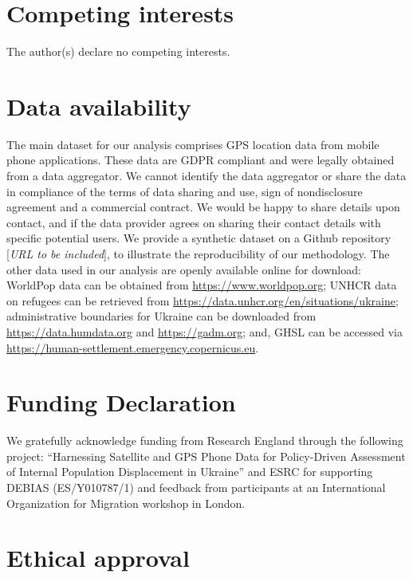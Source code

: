 \documentclass[
  sn-nature,
  11pt,
]{sn-jnl}
\begin{document}
\section{Competing interests}\label{competing-interests}

The author(s) declare no competing interests.

\section{Data availability}\label{data-availability}

The main dataset for our analysis comprises GPS location data from
mobile phone applications. These data are GDPR compliant and were
legally obtained from a data aggregator. We cannot identify the data
aggregator or share the data in compliance of the terms of data sharing
and use, sign of nondisclosure agreement and a commercial contract. We
would be happy to share details upon contact, and if the data provider
agrees on sharing their contact details with specific potential users.
We provide a synthetic dataset on a Github repository {[}\emph{URL to be
included}{]}, to illustrate the reproducibility of our methodology. The
other data used in our analysis are openly available online for
download: WorldPop data can be obtained from
\url{https://www.worldpop.org}; UNHCR data on refugees can be retrieved
from \url{https://data.unhcr.org/en/situations/ukraine}; administrative
boundaries for Ukraine can be downloaded from
\url{https://data.humdata.org} and \url{https://gadm.org}; and, GHSL can
be accessed via \url{https://human-settlement.emergency.copernicus.eu}.

\section{Funding Declaration}\label{funding-declaration}

We gratefully acknowledge funding from Research England through the
following project: ``Harnessing Satellite and GPS Phone Data for
Policy-Driven Assessment of Internal Population Displacement in
Ukraine'' and ESRC for supporting DEBIAS (ES/Y010787/1) and feedback
from participants at an International Organization for Migration
workshop in London.

\section{Ethical approval}\label{ethical-approval}
\end{document}
